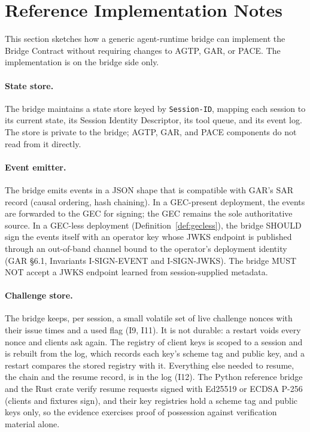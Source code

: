 \section{Reference Implementation Notes}
\label{sec:impl}

This section sketches how a generic agent-runtime bridge can implement
the Bridge Contract without requiring changes to AGTP, GAR, or PACE.
The implementation is on the bridge side only.

\paragraph{State store.} The bridge maintains a state store keyed by
\texttt{Session-ID}, mapping each session to its current state, its
Session Identity Descriptor, its tool queue, and its event log. The store
is private to the bridge; AGTP, GAR, and PACE components do not read
from it directly.

\paragraph{Event emitter.} The bridge emits events in a JSON shape that
is compatible with GAR's SAR record (causal ordering, hash chaining).
In a GEC-present deployment, the events are forwarded to the GEC for
signing; the GEC remains the sole authoritative source. In a GEC-less
deployment (Definition~\ref{def:gecless}), the bridge SHOULD sign the
events itself with an operator key whose JWKS endpoint is published
through an out-of-band channel bound to the operator's deployment
identity (GAR \S 6.1, Invariants I-SIGN-EVENT and I-SIGN-JWKS). The bridge MUST NOT accept a
JWKS endpoint learned from session-supplied metadata.

\paragraph{Challenge store.} The bridge keeps, per session, a small
volatile set of live challenge nonces with their issue times and a
used flag (I9, I11). It is not durable: a restart voids every nonce and
clients ask again. The registry of client keys is scoped to a session and is rebuilt from the
log, which records each key's scheme tag and public key, and a restart
compares the stored registry with it.
Everything else needed to resume, the chain and the resume record, is in
the log (I12). The Python reference bridge and the Rust crate verify
resume requests signed with Ed25519 or ECDSA P-256 (clients and fixtures
sign), and their key registries
hold a scheme tag and public keys only, so the evidence exercises proof of possession against verification
material alone.

